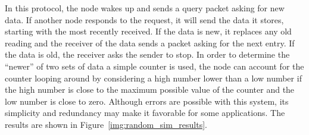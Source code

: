 In this protocol, the node wakes up and sends
a query packet asking for new data.  If another node responds to the request, it will send the data it stores, starting
with the most recently received.  If the data is new, it replaces any old reading and the receiver of the data sends a
packet asking for the next entry.  If the data is old, the receiver asks the sender to stop.  In order to determine the
``newer'' of two sets of data a simple counter is used, the node can account for the counter looping around by considering
a high number lower than a low number if the high number is close to the maximum possible value of the counter and the
low number is close to zero.  Although errors are possible with this system, its simplicity and redundancy may make it
favorable for some applications.  The results are shown in Figure~\ref{img:random_sim_results}.
